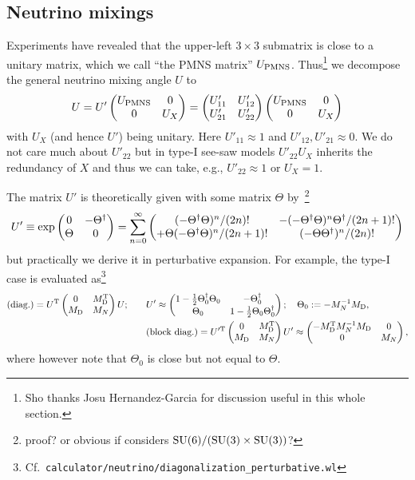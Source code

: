 \documentclass[CheatSheet]{subfiles}
\newcommand\MD[1][]{M_{\mathrm{D}#1}}
\newcommand\MN[1][]{M_{N#1}}
\begin{document}
\subsection{Neutrino mixings}
Experiments have revealed that the upper-left $3\times3$ submatrix is close to a unitary matrix, which we call ``the PMNS matrix'' $U_{\mathrm{PMNS}}$.
Thus\footnote{Sho thanks Josu Hernandez-Garcia for discussion useful in this whole section.}
 we decompose the general neutrino mixing angle $U$ to
\begin{equation}
 U = U'\begin{pmatrix}U_{\mathrm{PMNS}} & 0 \\ 0 & U_X\end{pmatrix}
  = \begin{pmatrix}U'_{11} & U'_{12} \\ U'_{21} & U'_{22}\end{pmatrix}\begin{pmatrix}U_{\mathrm{PMNS}} & 0 \\ 0 & U_X\end{pmatrix}
\end{equation}
with $U_X$ (and hence $U'$) being unitary.
Here $U'_{11}\approx1$ and $U'_{12},U'_{21}\approx0$.
We do not care much about $U'_{22}$ but in type-I see-saw models $U'_{22}U_X$ inherits the redundancy of $X$ and thus we can take, e.g., $U'_{22}\approx 1$ or $U_X=1$.

The matrix $U'$ is theoretically given with some matrix $\Theta$ by~\cite{Blennow:2011vn}\footnote{%
\TODO{}proof? or obvious if considers $\operatorname{\mathrm SU}(6)/(\operatorname{\mathrm SU}(3)\times\operatorname{\mathrm SU}(3))$?}
\begin{equation}
 U'\equiv \exp\begin{pmatrix}0 & -\Theta^\dagger \\ \Theta & 0\end{pmatrix}
=\sum_{n=0}^\infty\begin{pmatrix}
  {(-\Theta^\dagger\Theta)^{n}}/{(2n)!} &
  {-(-\Theta^\dagger\Theta)^{n}\Theta^\dagger}/{(2n+1)!}\\
  {+\Theta(-\Theta^\dagger\Theta)^{n}}/{(2n+1)!}&
  {(-\Theta\Theta^\dagger)^{n}}/{(2n)!}
\end{pmatrix}
\end{equation}
but practically we derive it in perturbative expansion.
For example, the type-I case is evaluated as\footnote{Cf.~\texttt{calculator/neutrino/diagonalization\_perturbative.wl}}
\begin{align}
 \text{(diag.)} = U^\TT\pmat{0 & \MD^\TT \\ \MD & \MN} U;\qquad
&U'\approx\pmat{
  1-\frac12 \Theta_0^\dagger \Theta_0&
  -\Theta_0^\dagger\\
 \Theta_0&
  1-\frac12\Theta_0\Theta_0^\dagger
};\quad \Theta_0:=-\MN^{-1}\MD,
\label{eq:typeIseesaw-blockdiag-1}\\
&\text{(block diag.)}=U'^\TT\pmat{0 & \MD^\TT \\ \MD & \MN} U'\approx\pmat{
  -\MD^\TT\MN^{-1}\MD & 0 \\ 0 & \MN
},
\label{eq:typeIseesaw-blockdiag-2}
\end{align}
where however note that $\Theta_0$ is close but not equal to $\Theta$.
\end{document}
